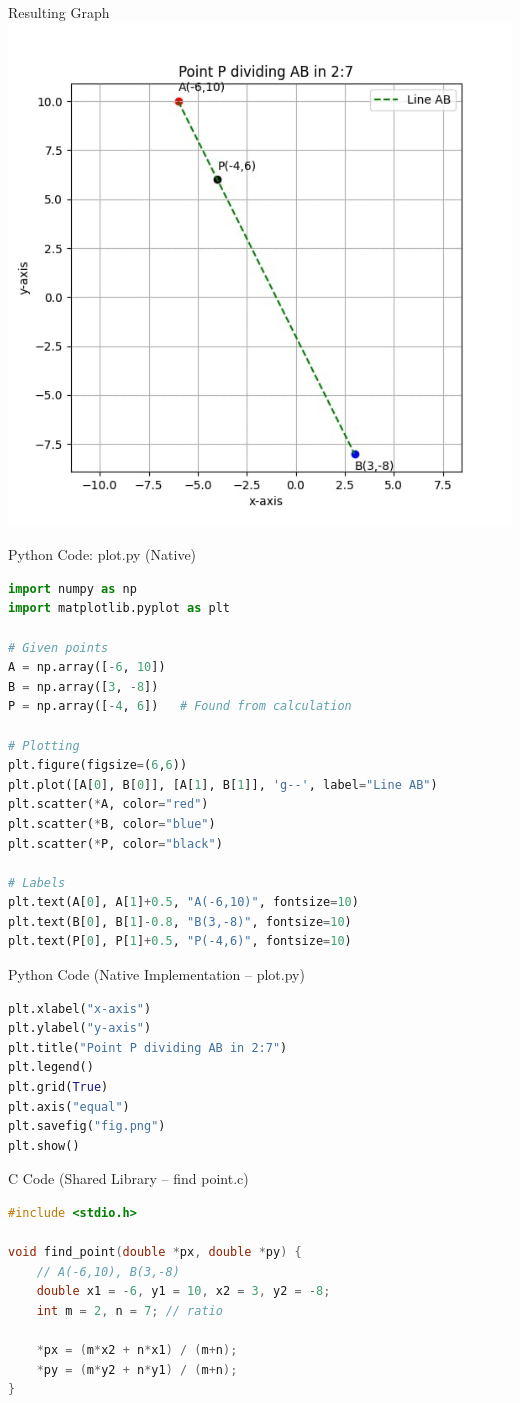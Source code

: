 \documentclass{beamer}
\begin{document}
\begin{frame}{Resulting Graph}
\centering
\includegraphics[width=0.6\linewidth]{figs/fig.jpg}
\end{frame}

\begin{frame}[fragile]{Python Code: plot.py (Native)}
\begin{lstlisting}[language=Python]
import numpy as np
import matplotlib.pyplot as plt

# Given points
A = np.array([-6, 10])
B = np.array([3, -8])
P = np.array([-4, 6])   # Found from calculation

# Plotting
plt.figure(figsize=(6,6))
plt.plot([A[0], B[0]], [A[1], B[1]], 'g--', label="Line AB")
plt.scatter(*A, color="red")
plt.scatter(*B, color="blue")
plt.scatter(*P, color="black")

# Labels
plt.text(A[0], A[1]+0.5, "A(-6,10)", fontsize=10)
plt.text(B[0], B[1]-0.8, "B(3,-8)", fontsize=10)
plt.text(P[0], P[1]+0.5, "P(-4,6)", fontsize=10)
\end{lstlisting}
\end{frame}


\begin{frame}[fragile]{Python Code (Native Implementation – plot.py)}
\begin{lstlisting}[language=Python]
plt.xlabel("x-axis")
plt.ylabel("y-axis")
plt.title("Point P dividing AB in 2:7")
plt.legend()
plt.grid(True)
plt.axis("equal")
plt.savefig("fig.png")
plt.show()
\end{lstlisting}
\end{frame}

\begin{frame}[fragile]{C Code (Shared Library – find point.c)}
\begin{lstlisting}[language=C]
#include <stdio.h>

void find_point(double *px, double *py) {
    // A(-6,10), B(3,-8)
    double x1 = -6, y1 = 10, x2 = 3, y2 = -8;
    int m = 2, n = 7; // ratio

    *px = (m*x2 + n*x1) / (m+n);
    *py = (m*y2 + n*y1) / (m+n);
}
\end{lstlisting}
\end{frame}
\end{document}
